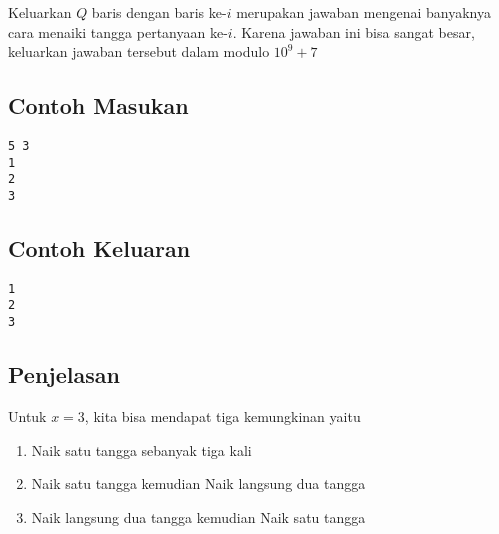 \documentclass{article}
\begin{document}
Keluarkan $Q$ baris dengan baris ke-$i$ merupakan jawaban mengenai banyaknya cara menaiki tangga pertanyaan ke-$i$. Karena jawaban ini bisa sangat besar, keluarkan jawaban tersebut dalam modulo $10^9 + 7$
\\

\begin{multicols}{2}
\subsection*{Contoh Masukan}
\begin{lstlisting}
5 3
1
2
3
\end{lstlisting}
\columnbreak
\subsection*{Contoh Keluaran}
\begin{lstlisting}
1
2
3
\end{lstlisting}
\vfill
\null
\end{multicols}

\subsection*{Penjelasan}
Untuk $x = 3$, kita bisa mendapat tiga kemungkinan yaitu
\vspace{-\baselineskip}
\begin{enumerate}
    \setlength\itemsep{0pt}
    \item Naik satu tangga sebanyak tiga kali
    \item Naik satu tangga kemudian Naik langsung dua tangga
    \item Naik langsung dua tangga kemudian Naik satu tangga
\end{enumerate}

\pagebreak
\end{document}
